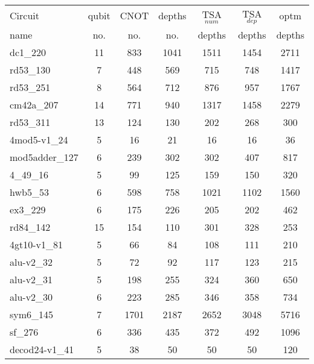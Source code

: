 \documentclass[journal]{IEEEtran}
\begin{document}
\begin{table*}[htbp]
    \begin{center}  
        \begin{tabular}{|p{4.3cm}<{\centering}|c|c|c|c|c|c|}
                            \hline
                            Circuit &  qubit  & CNOT &depths &TSA$_{num}$& TSA$_{dep}$  & optm 	  	\\
                             name	&   no. 	&	no. & no. & depths&  depths &  depths 	\\
                            \hline
                            dc1\_220 & 11 & 833 & 1041 & 1511 & 1454 & 2711 \\
                            rd53\_130 & 7 & 448 & 569 & 715 & 748 & 1417 \\
                            rd53\_251 & 8 & 564 & 712 & 876 & 957 & 1767 \\
                            cm42a\_207 & 14 & 771 & 940 & 1317 & 1458 & 2279 \\
                            rd53\_311 & 13 & 124 & 130 & 202 & 268 & 300 \\
                            4mod5-v1\_24 & 5 & 16 & 21 & 16 & 16 & 36 \\
                            mod5adder\_127 & 6 & 239 & 302 & 302 & 407 & 817 \\
                            4\_49\_16 & 5 & 99 & 125 & 159 & 150 & 320 \\
                            hwb5\_53 & 6 & 598 & 758 & 1021 & 1102 & 1560 \\
                            ex3\_229 & 6 & 175 & 226 & 205 & 202 & 462 \\
                            rd84\_142 & 15 & 154 & 110 & 301 & 328 & 253 \\
                            4gt10-v1\_81 & 5 & 66 & 84 & 108 & 111 & 210 \\
                            alu-v2\_32 & 5 & 72 & 92 & 117 & 123 & 215 \\
                            alu-v2\_31 & 5 & 198 & 255 & 324 & 360 & 650 \\
                            alu-v2\_30 & 6 & 223 & 285 & 346 & 358 & 734 \\
                            sym6\_145 & 7 & 1701 & 2187 & 2652 & 3048 & 5716 \\
                            sf\_276 & 6 & 336 & 435 & 372 & 492 & 1096 \\
                            decod24-v1\_41 & 5 & 38 & 50 & 50 & 50 & 120 \\

\end{tabular}
\end{center}
\end{table*}
\end{document}
